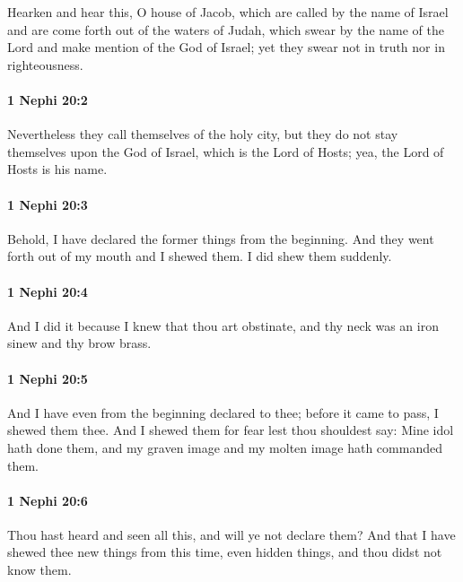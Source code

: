 			Hearken and hear this, O house of Jacob,
			which are called by the name of Israel
			and are come forth out of the waters of Judah,
			which swear by the name of the Lord
			and make mention of the God of Israel;
			yet they swear not in truth nor in righteousness.

		\paragraph{1 Nephi 20:2} %
			\label{1NEPHI-20-2}

			Nevertheless they call themselves of the holy city,
			but they do not stay themselves upon the God of Israel,
			which is the Lord of Hosts;
			yea, the Lord of Hosts is his name.

		\paragraph{1 Nephi 20:3} %
			\label{1NEPHI-20-3}

			Behold, I have declared the former things from the beginning.
			And they went forth out of my mouth and I shewed them.
			I did shew them suddenly.

		\paragraph{1 Nephi 20:4} %
			\label{1NEPHI-20-4}

			And I did it because I knew that thou art obstinate,
			and thy neck was an iron sinew and thy brow brass.

		\paragraph{1 Nephi 20:5} %
			\label{1NEPHI-20-5}

			And I have even from the beginning declared to thee;
			before it came to pass, I shewed them thee.
			And I shewed them for fear lest thou shouldest say:
			Mine idol hath done them,
			and my graven image and my molten image hath commanded them.

		\paragraph{1 Nephi 20:6} %
			\label{1NEPHI-20-6}

			Thou hast heard and seen all this,
			and will ye not declare them?
			And that I have shewed thee new things from this time,
			even hidden things,
			and thou didst not know them.

